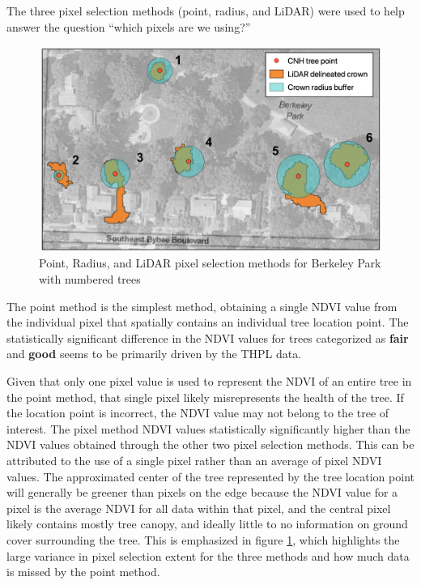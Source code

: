 \documentclass[12pt,twoside]{reedthesis}
\begin{document}
The three pixel selection methods (point, radius, and LiDAR) were used
to help answer the question ``which pixels are we using?''
\begin{figure}

{\centering \includegraphics[width=0.9\linewidth]{figure/layered_outputs_2} 

}

\caption[Pixel selection method comparison with numbered trees]{Point, Radius, and LiDAR pixel selection methods for Berkeley Park with numbered trees}\label{fig:layered-outputs-2}
\end{figure}
The point method is the simplest method, obtaining a single NDVI value
from the individual pixel that spatially contains an individual tree
location point. The statistically significant difference in the NDVI
values for trees categorized as \textbf{fair} and \textbf{good} seems to be
primarily driven by the THPL data.

Given that only one pixel value is used to represent the NDVI of an
entire tree in the point method, that single pixel likely misrepresents
the health of the tree. If the location point is incorrect, the NDVI
value may not belong to the tree of interest. The pixel method NDVI
values statistically significantly higher than the NDVI values obtained
through the other two pixel selection methods. This can be attributed to
the use of a single pixel rather than an average of pixel NDVI values.
The approximated center of the tree represented by the tree location
point will generally be greener than pixels on the edge because the NDVI
value for a pixel is the average NDVI for all data within that pixel,
and the central pixel likely contains mostly tree canopy, and ideally
little to no information on ground cover surrounding the tree. This is
emphasized in figure \ref{fig:layered-outputs-2}, which highlights the
large variance in pixel selection extent for the three methods and how
much data is missed by the point method.
\end{document}
